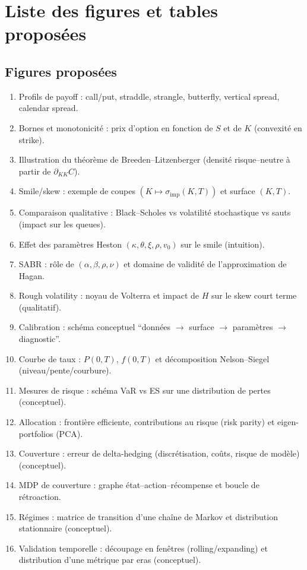 \documentclass[11pt,a4paper]{article}
\newcommand{\1}{\mathbf{1}}
\begin{document}
\section*{Liste des figures et tables propos\'ees}

\subsection*{Figures propos\'ees}
\begin{enumerate}[leftmargin=*,label=F\arabic*.]
  \item Profils de payoff : call/put, straddle, strangle, butterfly, vertical spread, calendar spread.
  \item Bornes et monotonicit\'e : prix d'option en fonction de $S$ et de $K$ (convexit\'e en strike).
  \item Illustration du th\'eor\`eme de Breeden--Litzenberger (densit\'e risque--neutre \`a partir de $\partial_{KK}C$).
  \item Smile/skew : exemple de coupes $(K\mapsto \sigma_{\mathrm{imp}}(K,T))$ et surface $(K,T)$.
  \item Comparaison qualitative : Black--Scholes vs volatilité stochastique vs sauts (impact sur les queues).
  \item Effet des param\`etres Heston $(\kappa,\theta,\xi,\rho,v_0)$ sur le smile (intuition).
  \item SABR : r\^ole de $(\alpha,\beta,\rho,\nu)$ et domaine de validit\'e de l'approximation de Hagan.
  \item Rough volatility : noyau de Volterra et impact de $H$ sur le skew court terme (qualitatif).
  \item Calibration : sch\'ema conceptuel ``donn\'ees $\rightarrow$ surface $\rightarrow$ param\`etres $\rightarrow$ diagnostic''.
  \item Courbe de taux : $P(0,T)$, $f(0,T)$ et d\'ecomposition Nelson--Siegel (niveau/pente/courbure).
  \item Mesures de risque : sch\'ema VaR vs ES sur une distribution de pertes (conceptuel).
  \item Allocation : fronti\`ere efficiente, contributions au risque (risk parity) et eigen-portfolios (PCA).
  \item Couverture : erreur de delta-hedging (discr\'etisation, co\^uts, risque de mod\`ele) (conceptuel).
  \item MDP de couverture : graphe \'etat--action--r\'ecompense et boucle de r\'etroaction.
  \item R\'egimes : matrice de transition d'une cha\^ine de Markov et distribution stationnaire (conceptuel).
  \item Validation temporelle : d\'ecoupage en fen\^etres (rolling/expanding) et distribution d'une m\'etrique par eras (conceptuel).
\end{enumerate}
\end{document}
